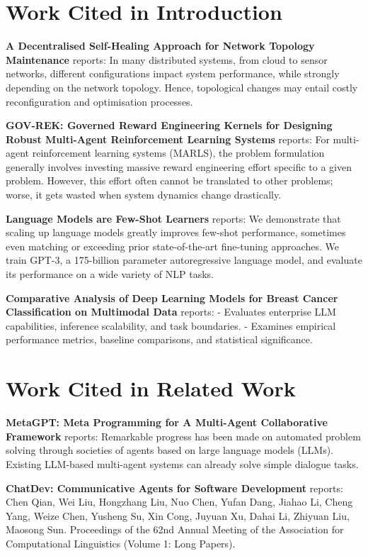 \documentclass[10pt,journal,compsoc,twocolumn]{IEEEtran}
\begin{document}
\section{Work Cited in Introduction}


\textbf{A Decentralised Self-Healing Approach for Network Topology Maintenance} \cite{arxiv_2010_11146} reports: In many distributed systems, from cloud to sensor networks, different configurations impact system performance, while strongly depending on the network topology. Hence, topological changes may entail costly reconfiguration and optimisation processes.

\textbf{GOV-REK: Governed Reward Engineering Kernels for Designing Robust Multi-Agent Reinforcement Learning Systems} \cite{arxiv_2404_01131} reports: For multi-agent reinforcement learning systems (MARLS), the problem formulation generally involves investing massive reward engineering effort specific to a given problem. However, this effort often cannot be translated to other problems; worse, it gets wasted when system dynamics change drastically.

\textbf{Language Models are Few-Shot Learners} \cite{arxiv_2005_14165} reports: We demonstrate that scaling up language models greatly improves few-shot performance, sometimes even matching or exceeding prior state-of-the-art fine-tuning approaches. We train GPT-3, a 175-billion parameter autoregressive language model, and evaluate its performance on a wide variety of NLP tasks.

\textbf{Comparative Analysis of Deep Learning Models for Breast Cancer Classification on Multimodal Data} \cite{crossref_10_1145_3689096_3689462} reports: - Evaluates enterprise LLM capabilities, inference scalability, and task boundaries. - Examines empirical performance metrics, baseline comparisons, and statistical significance.


\section{Work Cited in Related Work}


\textbf{MetaGPT: Meta Programming for A Multi-Agent Collaborative Framework} \cite{crossref_10_48550_arxiv_2308_00352} reports: Remarkable progress has been made on automated problem solving through societies of agents based on large language models (LLMs). Existing LLM-based multi-agent systems can already solve simple dialogue tasks.

\textbf{ChatDev: Communicative Agents for Software Development} \cite{crossref_10_18653_v1_2024_acl_long_810} reports: Chen Qian, Wei Liu, Hongzhang Liu, Nuo Chen, Yufan Dang, Jiahao Li, Cheng Yang, Weize Chen, Yusheng Su, Xin Cong, Juyuan Xu, Dahai Li, Zhiyuan Liu, Maosong Sun. Proceedings of the 62nd Annual Meeting of the Association for Computational Linguistics (Volume 1: Long Papers).
\end{document}
